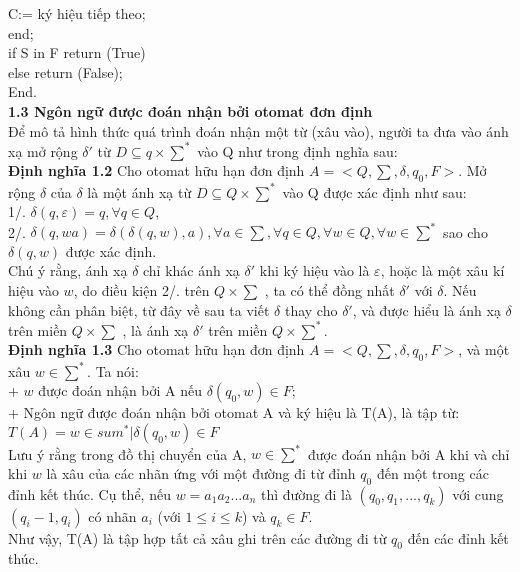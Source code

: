 \begin{flushleft}
\hspace{30mm} C:= ký hiệu tiếp theo;\\
\hspace{20mm} end;\\
\hspace{10mm} if S in F return (True)\\
\hspace{10mm} else return (False);\\
End.\\
\textbf{1.3 Ngôn ngữ được đoán nhận bởi otomat đơn định}\\
Để mô tả hình thức quá trình đoán nhận một từ (xâu vào), người ta đưa vào ánh xạ mở rộng $\delta'$ từ $D \subseteq q \times \sum^*$ vào Q như trong định nghĩa sau: \\
\textbf{Định nghĩa 1.2} Cho otomat hữu hạn đơn định $A = <Q, \sum, \delta, q_0, F>$. Mở rộng $\delta$ của $\delta$ là một ánh xạ từ $D \subseteq Q \times \sum^*$ vào Q được xác định như sau: \\
1/. $\delta(q, \varepsilon) = q, \forall q \in Q$,\\
2/. $\delta(q, wa) = \delta(\delta(q, w), a), \forall a \in \sum, \forall q\in Q, \forall w \in Q, \forall w \in \sum^*$ sao cho $\delta(q, w)$ được xác định.\\
Chú ý rằng, ánh xạ $\delta$ chỉ khác ánh xạ $\delta'$ khi ký hiệu vào là $\varepsilon$, hoặc là một xâu kí hiệu vào $w$, do điều kiện 2/. trên $Q \times \sum$ , ta có thể đồng nhất $\delta'$ với $\delta$. Nếu không cần phân biệt, từ đây về sau ta viết $\delta$ thay cho $\delta'$, và được hiểu là ánh xạ $\delta$ trên miền $Q \times \sum$ , là ánh xạ $\delta'$ trên miền $Q \times \sum^*$.\\
\textbf{Định nghĩa 1.3} Cho otomat hữu hạn đơn định $A = <Q, \sum, \delta, q_0, F>$, và một xâu $w \in \sum^*$. Ta nói:\\
+ $w$ được đoán nhận bởi A nếu $\delta(q_0, w) \in F$;\\
+ Ngôn ngữ được đoán nhận bởi otomat A và ký hiệu là T(A), là tập từ:\\
$T(A) = {w \in sum^* | \delta(q_0, w) \in F}$\\
Lưu ý rằng trong đồ thị chuyển của A, $w \in \sum^*$ được đoán nhận bởi A khi và chỉ khi $w$ là xâu của các nhãn ứng với một đường đi từ đỉnh $q_0$ đến một trong các đỉnh kết thúc. Cụ thể, nếu $w= a_1a_2...a_n$ thì đường đi là $(q_0, q_1,..., q_k)$ với cung $(q_i-1, q_i)$ có nhãn $a_i$ (với $1 \le i \le k$) và $q_k \in F$.\\
Như vậy, T(A) là tập hợp tất cả xâu ghi trên các đường đi từ $q_0$ đến các đỉnh kết thúc.\\

\end{flushleft}
